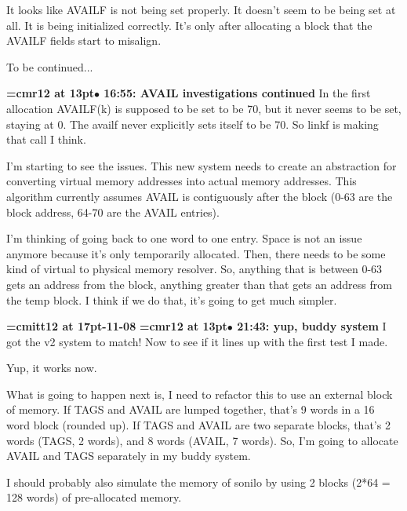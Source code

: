 It looks like AVAILF is not being set properly. It doesn't seem to be being set at all. It is being initialized correctly. It's only after allocating a block that the AVAILF fields start to misalign.
\par

To be continued...
\par

{\smallskip\noindent\bf\font\titlefont=cmr12 at 13pt\titlefont $\bullet$ 16:55: AVAIL investigations continued}\smallskip
In the first allocation AVAILF(k) is supposed to be set to be 70, but it never seems to be set, staying at 0. The availf never explicitly sets itself to be 70. So linkf is making that call I think.
\par

I'm starting to see the issues. This new system needs to create an abstraction for converting virtual memory addresses into actual memory addresses. This algorithm currently assumes AVAIL is contiguously after the block (0-63 are the block address, 64-70 are the AVAIL entries).
\par

I'm thinking of going back to one word to one entry. Space is not an issue anymore because it's only temporarily allocated. Then, there needs to be some kind of virtual to physical memory resolver. So, anything that is between 0-63 gets an address from the block, anything greater than that gets an address from the temp block. I think if we do that, it's going to get much simpler.
\par

{\medskip\noindent\bf\font\titlefont=cmitt12 at 17pt-11-08}\medskip
{\smallskip\noindent\bf\font\titlefont=cmr12 at 13pt\titlefont $\bullet$ 21:43: yup, buddy system}\smallskip
I got the v2 system to match! Now to see if it lines up with the first test I made.
\par

Yup, it works now.
\par

What is going to happen next is, I need to refactor this to use an external block of memory. If TAGS and AVAIL are lumped together, that's 9 words in a 16 word block (rounded up). If TAGS and AVAIL are two separate blocks, that's 2 words (TAGS, 2 words), and 8 words (AVAIL, 7 words). So, I'm going to allocate AVAIL and TAGS separately in my buddy system.
\par

I should probably also simulate the memory of sonilo by using 2 blocks (2*64 = 128 words) of pre-allocated memory.
\par

